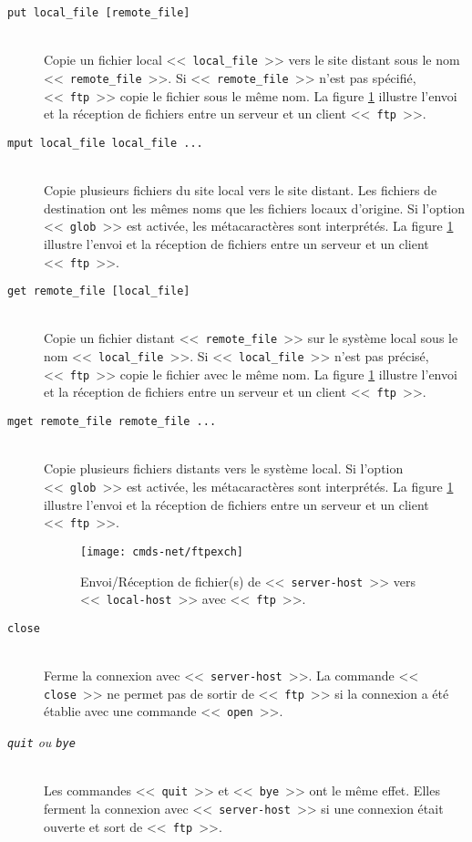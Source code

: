 \begin{description}
	\item[{\tt put local\_file [remote\_file]}]\mbox{}\\
	Copie un fichier local <<~{\tt local\_file}~>> vers le site distant
	sous le nom <<~{\tt remote\_file}~>>. Si <<~{\tt remote\_file}~>> n'est
	pas sp{\'e}cifi{\'e}, <<~{\tt ftp}~>> copie le fichier sous le m{\^e}me nom. La figure
	\ref{fig-cmdnet-ftpexch} illustre l'envoi et la r{\'e}ception de fichiers
	entre un serveur et un client <<~{\tt ftp}~>>.


	\item[{\tt mput local\_file local\_file ...}]\mbox{}\\
	Copie plusieurs fichiers du site local vers le site distant. Les
	fichiers de destination ont les m{\^e}mes noms que les fichiers locaux
	d'origine. Si l'option <<~{\tt glob}~>> est activ{\'e}e, les
	m{\'e}tacaract{\`e}res sont interpr{\'e}t{\'e}s. La figure \ref{fig-cmdnet-ftpexch}
	illustre l'envoi et la r{\'e}ception de fichiers entre un serveur et un
	client <<~{\tt ftp}~>>.


	\item[{\tt get remote\_file [local\_file]}]\mbox{}\\
	Copie un fichier distant <<~{\tt remote\_file}~>> sur le syst{\`e}me local
	sous le nom <<~{\tt local\_file}~>>. Si <<~{\tt local\_file}~>> n'est
	pas pr{\'e}cis{\'e}, <<~{\tt ftp}~>> copie le fichier avec le m{\^e}me nom. La figure
	\ref{fig-cmdnet-ftpexch} illustre l'envoi et la r{\'e}ception de fichiers
	entre un serveur et un client <<~{\tt ftp}~>>.


	\item[{\tt mget remote\_file remote\_file ...}]\mbox{}\\
	Copie plusieurs fichiers distants vers le syst{\`e}me local. Si l'option
	<<~{\tt glob}~>> est activ{\'e}e, les m{\'e}tacaract{\`e}res sont interpr{\'e}t{\'e}s. La figure
	\ref{fig-cmdnet-ftpexch} illustre l'envoi et la r{\'e}ception de fichiers
	entre un serveur et un client <<~{\tt ftp}~>>.

	\begin{figure}[hbtp]
	\centering
	\texttt{[image: cmds-net/ftpexch]}
	\caption{\label{fig-cmdnet-ftpexch}Envoi/R{\'e}ception de fichier(s) de
	<<~{\tt server-host}~>> vers <<~{\tt local-host}~>> avec <<~{\tt ftp}~>>.}
	\end{figure}

	\item[{\tt close}]\mbox{}\\
	Ferme la connexion avec <<~{\tt server-host}~>>. La commande <<~{\tt
	close}~>> ne permet pas de sortir de <<~{\tt ftp}~>> si la connexion a {\'e}t{\'e}
	{\'e}tablie avec une commande <<~{\tt open}~>>.

	\item[{\sl {\tt quit} ou {\tt bye}}]\mbox{}\\
	Les commandes <<~{\tt quit}~>> et <<~{\tt bye}~>> ont le m{\^e}me effet.
	Elles ferment la connexion avec <<~{\tt server-host}~>> si une
	connexion {\'e}tait ouverte et sort de <<~{\tt ftp}~>>.
\end{description}

